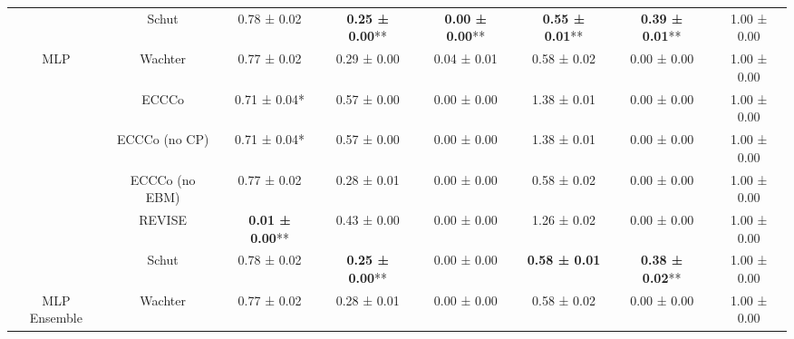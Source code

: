 \begin{table}
{\begin{tabular}[t]{cccccccc}
 & Schut & 0.78 ± 0.02\hphantom{*}\hphantom{*} & \textbf{0.25 ± 0.00}** & \textbf{0.00 ± 0.00}** & \textbf{0.55 ± 0.01}** & \textbf{0.39 ± 0.01}** & 1.00 ± 0.00\hphantom{*}\hphantom{*}\\

\multirow[t]{-6}{*}{\centering\arraybackslash MLP} & Wachter & 0.77 ± 0.02\hphantom{*}\hphantom{*} & 0.29 ± 0.00\hphantom{*}\hphantom{*} & 0.04 ± 0.01\hphantom{*}\hphantom{*} & 0.58 ± 0.02\hphantom{*}\hphantom{*} & 0.00 ± 0.00\hphantom{*}\hphantom{*} & 1.00 ± 0.00\hphantom{*}\hphantom{*}\\
\cmidrule{1-8}
 & ECCCo & 0.71 ± 0.04*\hphantom{*} & 0.57 ± 0.00\hphantom{*}\hphantom{*} & 0.00 ± 0.00\hphantom{*}\hphantom{*} & 1.38 ± 0.01\hphantom{*}\hphantom{*} & 0.00 ± 0.00\hphantom{*}\hphantom{*} & 1.00 ± 0.00\hphantom{*}\hphantom{*}\\

 & ECCCo (no CP) & 0.71 ± 0.04*\hphantom{*} & 0.57 ± 0.00\hphantom{*}\hphantom{*} & 0.00 ± 0.00\hphantom{*}\hphantom{*} & 1.38 ± 0.01\hphantom{*}\hphantom{*} & 0.00 ± 0.00\hphantom{*}\hphantom{*} & 1.00 ± 0.00\hphantom{*}\hphantom{*}\\

 & ECCCo (no EBM) & 0.77 ± 0.02\hphantom{*}\hphantom{*} & 0.28 ± 0.01\hphantom{*}\hphantom{*} & 0.00 ± 0.00\hphantom{*}\hphantom{*} & 0.58 ± 0.02\hphantom{*}\hphantom{*} & 0.00 ± 0.00\hphantom{*}\hphantom{*} & 1.00 ± 0.00\hphantom{*}\hphantom{*}\\

 & REVISE & \textbf{0.01 ± 0.00}** & 0.43 ± 0.00\hphantom{*}\hphantom{*} & 0.00 ± 0.00\hphantom{*}\hphantom{*} & 1.26 ± 0.02\hphantom{*}\hphantom{*} & 0.00 ± 0.00\hphantom{*}\hphantom{*} & 1.00 ± 0.00\hphantom{*}\hphantom{*}\\

 & Schut & 0.78 ± 0.02\hphantom{*}\hphantom{*} & \textbf{0.25 ± 0.00}** & 0.00 ± 0.00\hphantom{*}\hphantom{*} & \textbf{0.58 ± 0.01}\hphantom{*}\hphantom{*} & \textbf{0.38 ± 0.02}** & 1.00 ± 0.00\hphantom{*}\hphantom{*}\\

\multirow[t]{-6}{*}{\centering\arraybackslash MLP Ensemble} & Wachter & 0.77 ± 0.02\hphantom{*}\hphantom{*} & 0.28 ± 0.01\hphantom{*}\hphantom{*} & 0.00 ± 0.00\hphantom{*}\hphantom{*} & 0.58 ± 0.02\hphantom{*}\hphantom{*} & 0.00 ± 0.00\hphantom{*}\hphantom{*} & 1.00 ± 0.00\hphantom{*}\hphantom{*}\\
\bottomrule
\end{tabular}}
\end{table}
